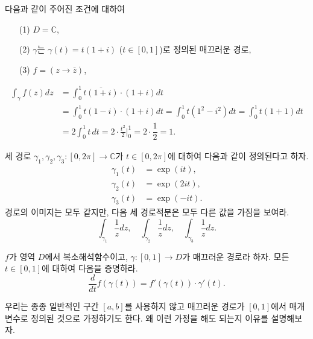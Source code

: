 \begin{salt_example} \label{example-3-2}
다음과 같이 주어진 조건에 대하여
\begin{itemize}
\item[(1)] $D=\mathbb C$,
\item[(2)] $\gamma$는 $\gamma(t)= t(1+i)$ ($t\in[0,1]$)로 정의된 매끄러운 경로,
\item[(3)] $f = (z\to \bar z)$,
\end{itemize}
\begin{align*}
\int_\gamma f(z)dz &= \int_0^1 \overline{t(1+i)}\cdot (1+i)dt \\
&= \int_0^1 t(1-i)\cdot(1+i)dt
= \int_0^1 t(1^2-i^2)dt = \int_0^1 t(1+1)dt \\
&= 2\int_0^1 t\,dt = 2\cdot \frac{t^2}2 \Big|_0^1 = 2\cdot \dfrac12 = 1.
\end{align*}
\end{salt_example}

\begin{salt_exercise} \label{ex-3-1}
세 경로 $\gamma_1, \gamma_2, \gamma_3: [0,2\pi] \to \mathbb C$가 
$t\in[0,2\pi]$에 대하여 다음과 같이 정의된다고 하자.
\begin{align*}
\gamma_1(t) &= \exp(it), \\
\gamma_2(t) &= \exp(2it), \\
\gamma_3(t) &= \exp(-it).
\end{align*}
경로의 이미지는 모두 같지만, 다음 세 경로적분은 모두 다른 값을 가짐을 보여라.
\[
\int_{\gamma_1} \dfrac1zdz, \quad
\int_{\gamma_2} \dfrac1zdz, \quad
\int_{\gamma_3} \dfrac1zdz.
\]
\end{salt_exercise}

\begin{salt_exercise} \label{ex-3-2}
$f$가 영역 $D$에서 복소해석함수이고, $\gamma:[0,1]\to D$가 매끄러운 경로라 하자.
모든 $t\in[0,1]$에 대하여 다음을 증명하라.
\[
\dfrac{d}{dt} f(\gamma(t)) = f'(\gamma(t))\cdot \gamma'(t). 
\]
\end{salt_exercise}

우리는 종종 일반적인 구간 $[a,b]$를 사용하지 않고
매끄러운 경로가 $[0,1]$에서 매개변수로 정의된 것으로 가정하기도 한다.
왜 이런 가정을 해도 되는지 이유를 설명해보자.

